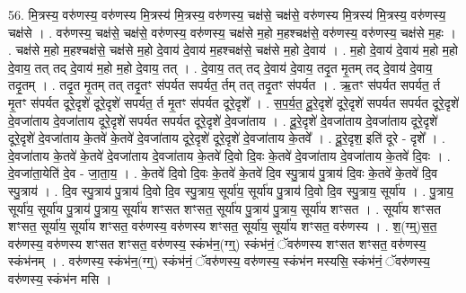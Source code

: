 \documentclass[17pt]{extarticle}
\begin{document}
56. मि॒त्रस्य॒ वरु॑णस्य॒ वरु॑णस्य मि॒त्रस्य॑ मि॒त्रस्य॒ वरु॑णस्य॒ चक्ष॑से॒ चक्ष॑से॒ वरु॑णस्य मि॒त्रस्य॑ मि॒त्रस्य॒ वरु॑णस्य॒ चक्ष॑से । . वरु॑णस्य॒ चक्ष॑से॒ चक्ष॑से॒ वरु॑णस्य॒ वरु॑णस्य॒ चक्ष॑से म॒हो म॒हश्चक्ष॑से॒ वरु॑णस्य॒ वरु॑णस्य॒ चक्ष॑से म॒हः । . चक्ष॑से म॒हो म॒हश्चक्ष॑से॒ चक्ष॑से म॒हो दे॒वाय॑ दे॒वाय॑ म॒हश्चक्ष॑से॒ चक्ष॑से म॒हो दे॒वाय॑ । . म॒हो दे॒वाय॑ दे॒वाय॑ म॒हो म॒हो दे॒वाय॒ तत् तद् दे॒वाय॑ म॒हो म॒हो दे॒वाय॒ तत् । . दे॒वाय॒ तत् तद् दे॒वाय॑ दे॒वाय॒ तदृ॒त मृ॒तम् तद् दे॒वाय॑ दे॒वाय॒ तदृ॒तम् । . तदृ॒त मृ॒तम् तत् तदृ॒तꣳ स॑पर्यत सपर्यत॒ र्तम् तत् तदृ॒तꣳ स॑पर्यत । . ऋ॒तꣳ स॑पर्यत सपर्यत॒ र्त मृ॒तꣳ स॑पर्यत दूरे॒दृशे॑ दूरे॒दृशे॑ सपर्यत॒ र्त मृ॒तꣳ स॑पर्यत दूरे॒दृशे᳚ । . स॒प॒र्य॒त॒ दू॒रे॒दृशे॑ दूरे॒दृशे॑ सपर्यत सपर्यत दूरे॒दृशे॑ दे॒वजा॑ताय दे॒वजा॑ताय दूरे॒दृशे॑ सपर्यत सपर्यत दूरे॒दृशे॑ दे॒वजा॑ताय । . दू॒रे॒दृशे॑ दे॒वजा॑ताय दे॒वजा॑ताय दूरे॒दृशे॑ दूरे॒दृशे॑ दे॒वजा॑ताय के॒तवे॑ के॒तवे॑ दे॒वजा॑ताय दूरे॒दृशे॑ दूरे॒दृशे॑ दे॒वजा॑ताय के॒तवे᳚ । . दू॒रे॒दृश॒ इति॑ दूरे - दृशे᳚ । . दे॒वजा॑ताय के॒तवे॑ के॒तवे॑ दे॒वजा॑ताय दे॒वजा॑ताय के॒तवे॑ दि॒वो दि॒वः के॒तवे॑ दे॒वजा॑ताय दे॒वजा॑ताय के॒तवे॑ दि॒वः । . दे॒वजा॑ता॒येति॑ दे॒व - जा॒ता॒य॒ । . के॒तवे॑ दि॒वो दि॒वः के॒तवे॑ के॒तवे॑ दि॒व स्पु॒त्राय॑ पु॒त्राय॑ दि॒वः के॒तवे॑ के॒तवे॑ दि॒व स्पु॒त्राय॑ । . दि॒व स्पु॒त्राय॑ पु॒त्राय॑ दि॒वो दि॒व स्पु॒त्राय॒ सूर्या॑य॒ सूर्या॑य पु॒त्राय॑ दि॒वो दि॒व स्पु॒त्राय॒ सूर्या॑य । . पु॒त्राय॒ सूर्या॑य॒ सूर्या॑य पु॒त्राय॑ पु॒त्राय॒ सूर्या॑य शꣳसत शꣳसत॒ सूर्या॑य पु॒त्राय॑ पु॒त्राय॒ सूर्या॑य शꣳसत । . सूर्या॑य शꣳसत शꣳसत॒ सूर्या॑य॒ सूर्या॑य शꣳसत॒ वरु॑णस्य॒ वरु॑णस्य शꣳसत॒ सूर्या॑य॒ सूर्या॑य शꣳसत॒ वरु॑णस्य । . श॒(ग्म्॒)स॒त॒ वरु॑णस्य॒ वरु॑णस्य शꣳसत शꣳसत॒ वरु॑णस्य॒ स्कंभ॑न॒(ग्ग्॒) स्कंभ॑नं॒ ॅवरु॑णस्य शꣳसत शꣳसत॒ वरु॑णस्य॒ स्कंभ॑नम् । . वरु॑णस्य॒ स्कंभ॑न॒(ग्ग्॒) स्कंभ॑नं॒ ॅवरु॑णस्य॒ वरु॑णस्य॒ स्कंभ॑न मस्यसि॒ स्कंभ॑नं॒ ॅवरु॑णस्य॒ वरु॑णस्य॒ स्कंभ॑न मसि । \newline
\end{document}
